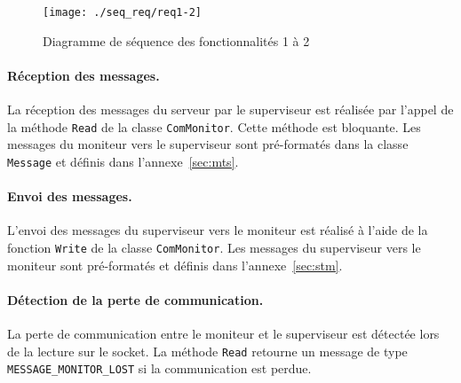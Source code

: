 
%    
\begin{figure}[htbp]
\begin{center}
\texttt{[image: ./seq\_req/req1-2]}
\caption{Diagramme de séquence des fonctionnalités 1 à 2}
\label{fig:diag1_2}
\end{center}
\end{figure}

\paragraph{Réception des messages.} La réception des messages du serveur par le superviseur est réalisée par l'appel de la méthode  {\tt Read} de la classe {\tt ComMonitor}. Cette méthode est bloquante. Les messages du moniteur vers le superviseur sont pré-formatés dans la classe {\tt Message} et définis dans l'annexe~\ref{sec:mts}.\\



\paragraph{Envoi des messages.} L'envoi des messages du superviseur vers le moniteur est réalisé à l'aide de la fonction {\tt Write} de la classe {\tt ComMonitor}. Les messages du superviseur vers le moniteur sont pré-formatés et définis dans l'annexe~\ref{sec:stm}.\\


\paragraph{Détection de la perte de communication.} La perte de communication entre le moniteur et le superviseur est détectée lors de la lecture sur le socket. La méthode {\tt Read} retourne un message de type {\tt MESSAGE\_MONITOR\_LOST}  si la communication est perdue. \\

